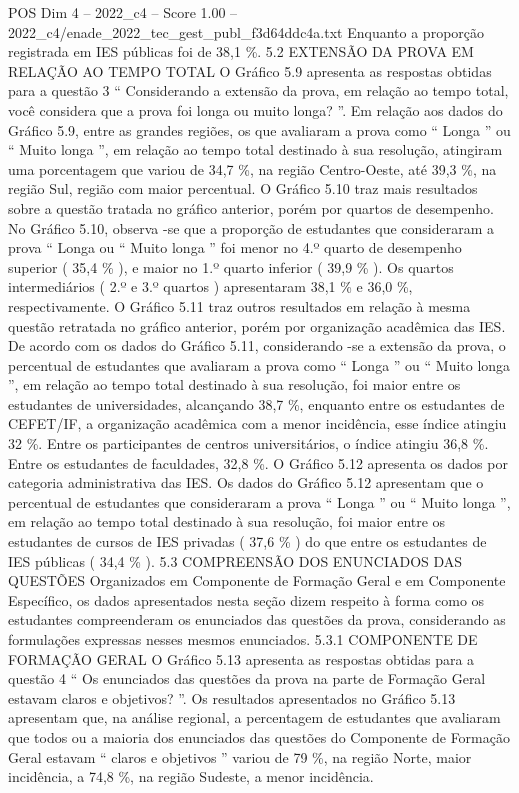 \begin{textsample}{POS Dim 4 – 2022\_c4 – Score 1.00 – 2022\_c4/enade\_2022\_tec\_gest\_publ\_f3d64ddc4a.txt}
Enquanto a proporção registrada em IES públicas foi de 38,1 \%. 5.2 EXTENSÃO DA PROVA EM RELAÇÃO AO TEMPO TOTAL O Gráfico 5.9 apresenta as respostas obtidas para a questão 3 “ Considerando a extensão da prova, em relação ao tempo total, você considera que a prova foi longa ou muito longa? ”.
Em relação aos dados do Gráfico 5.9, entre as grandes regiões, os que avaliaram a prova como “ Longa ” ou “ Muito longa ”, em relação ao tempo total destinado à sua resolução, atingiram uma porcentagem que variou de 34,7 \%, na região Centro-Oeste, até 39,3 \%, na região Sul, região com maior percentual.
O Gráfico 5.10 traz mais resultados sobre a questão tratada no gráfico anterior, porém por quartos de desempenho.
No Gráfico 5.10, observa -se que a proporção de estudantes que consideraram a prova “ Longa ou “ Muito longa ” foi menor no 4.º quarto de desempenho superior ( 35,4 \% ), e maior no 1.º quarto inferior ( 39,9 \% ).
Os quartos intermediários ( 2.º e 3.º quartos ) apresentaram 38,1 \% e 36,0 \%, respectivamente.
O Gráfico 5.11 traz outros resultados em relação à mesma questão retratada no gráfico anterior, porém por organização acadêmica das IES.
De acordo com os dados do Gráfico 5.11, considerando -se a extensão da prova, o percentual de estudantes que avaliaram a prova como “ Longa ” ou “ Muito longa ”, em relação ao tempo total destinado à sua resolução, foi maior entre os estudantes de universidades, alcançando 38,7 \%, enquanto entre os estudantes de CEFET/IF, a organização acadêmica com a menor incidência, esse índice atingiu 32 \%.
Entre os participantes de centros universitários, o índice atingiu 36,8 \%.
Entre os estudantes de faculdades, 32,8 \%.
O Gráfico 5.12 apresenta os dados por categoria administrativa das IES.
Os dados do Gráfico 5.12 apresentam que o percentual de estudantes que consideraram a prova “ Longa ” ou “ Muito longa ”, em relação ao tempo total destinado à sua resolução, foi maior entre os estudantes de cursos de IES privadas ( 37,6 \% ) do que entre os estudantes de IES públicas ( 34,4 \% ). 5.3 COMPREENSÃO DOS ENUNCIADOS DAS QUESTÕES Organizados em Componente de Formação Geral e em Componente Específico, os dados apresentados nesta seção dizem respeito à forma como os estudantes compreenderam os enunciados das questões da prova, considerando as formulações expressas nesses mesmos enunciados. 5.3.1 COMPONENTE DE FORMAÇÃO GERAL O Gráfico 5.13 apresenta as respostas obtidas para a questão 4 “ Os enunciados das questões da prova na parte de Formação Geral estavam claros e objetivos? ”.
Os resultados apresentados no Gráfico 5.13 apresentam que, na análise regional, a percentagem de estudantes que avaliaram que todos ou a maioria dos enunciados das questões do Componente de Formação Geral estavam “ claros e objetivos ” variou de 79 \%, na região Norte, maior incidência, a 74,8 \%, na região Sudeste, a menor incidência.

\end{textsample}
